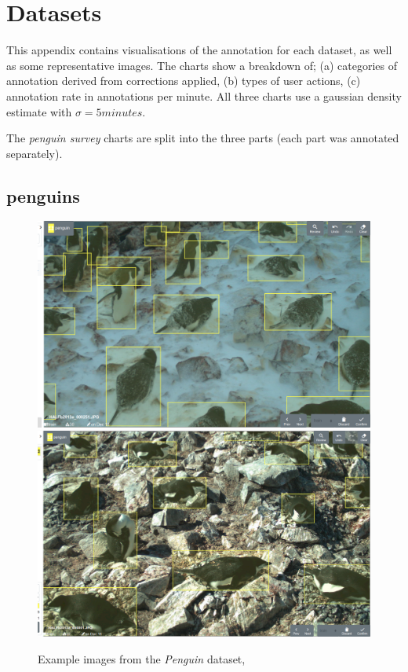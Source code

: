 \chapter{Datasets}
\label{chap:datasets} 

This appendix contains visualisations of the annotation for each dataset, as well as some representative images. The charts show a breakdown of; (a) categories of annotation derived from corrections applied, (b) types of user actions, (c) annotation rate in annotations per minute. All three charts use a gaussian density estimate with $\sigma=5 minutes$. 

The \emph{penguin survey} charts are split into the three parts (each part was annotated separately).

\newpage
\section{penguins}
\label{sec:penguins_details}

\begin{figure}[!h]
\centering
  \includegraphics[width=0.475\linewidth]{figures/annotation/screenshots/penguins.png}
  \hfill
  \includegraphics[width=0.475\linewidth]{figures/annotation/screenshots/penguins2.png}

\caption{Example images from the \emph{Penguin} dataset, \cite{PenguinData}}
\label{fig:penguin_dataset}
\end{figure}

